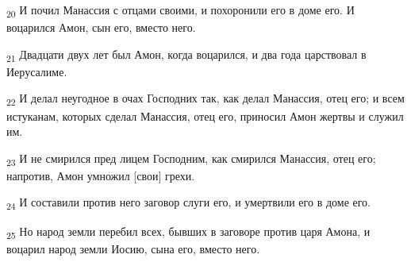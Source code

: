 \begin{tcolorbox}
\textsubscript{20} И почил Манассия с отцами своими, и похоронили его в доме его. И воцарился Амон, сын его, вместо него.
\end{tcolorbox}
\begin{tcolorbox}
\textsubscript{21} Двадцати двух лет был Амон, когда воцарился, и два года царствовал в Иерусалиме.
\end{tcolorbox}
\begin{tcolorbox}
\textsubscript{22} И делал неугодное в очах Господних так, как делал Манассия, отец его; и всем истуканам, которых сделал Манассия, отец его, приносил Амон жертвы и служил им.
\end{tcolorbox}
\begin{tcolorbox}
\textsubscript{23} И не смирился пред лицем Господним, как смирился Манассия, отец его; напротив, Амон умножил [свои] грехи.
\end{tcolorbox}
\begin{tcolorbox}
\textsubscript{24} И составили против него заговор слуги его, и умертвили его в доме его.
\end{tcolorbox}
\begin{tcolorbox}
\textsubscript{25} Но народ земли перебил всех, бывших в заговоре против царя Амона, и воцарил народ земли Иосию, сына его, вместо него.
\end{tcolorbox}
